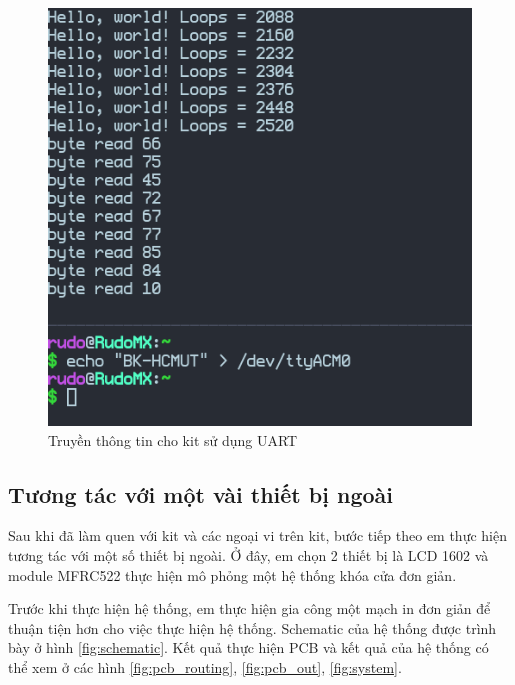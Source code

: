 \begin{figure}[ht]
\centering
\includegraphics[scale=0.5]{images/cycle_uart_read.png}
\caption{Truyền thông tin cho kit sử dụng UART}
\label{fig:cycle_uart_read}
\end{figure}

\clearpage
\subsection{Tương tác với một vài thiết bị ngoài}\label{lbl:rust_mfrc522}
Sau khi đã làm quen với kit và các ngoại vi trên kit, bước tiếp theo em thực hiện tương tác với một số thiết bị ngoài.
Ở đây, em chọn 2 thiết bị là LCD 1602 \cite{lcd_datasheet} và module MFRC522 \cite{mfrc522_datasheet} thực hiện mô phỏng một hệ thống khóa cửa đơn giản.

Trước khi thực hiện hệ thống, em thực hiện gia công một mạch in đơn giản để thuận tiện hơn cho việc thực hiện hệ thống.
Schematic của hệ thống được trình bày ở hình \ref{fig:schematic}.
Kết quả thực hiện PCB và kết quả của hệ thống có thể xem ở các hình \ref{fig:pcb_routing}, \ref{fig:pcb_out}, \ref{fig:system}.

